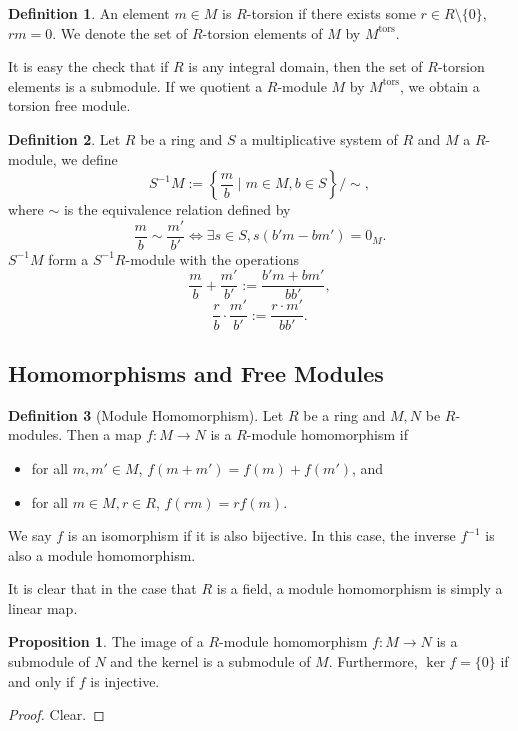 \documentclass[]{article}
\theoremstyle{definition}
\theoremstyle{definition}
\newtheorem{definition}{Definition}[section]
\newtheorem{proposition}{Proposition}[section]
\begin{document}
\begin{definition}
  An element \(m \in M\) is \(R\)-torsion if there exists some 
  \(r \in R \setminus \{0\}\), \(rm = 0\). We denote the set of \(R\)-torsion 
  elements of \(M\) by \(M^{\text{tors}}\).
\end{definition}

It is easy the check that if \(R\) is any integral domain, then the set of 
\(R\)-torsion elements is a submodule. If we quotient a \(R\)-module \(M\) by 
\(M^{\text{tors}}\), we obtain a torsion free module.

\begin{definition}
  Let \(R\) be a ring and \(S\) a multiplicative system of \(R\) and 
  \(M\) a \(R\)-module, we define 
  \[S^{-1}M := \left\{\frac{m}{b} \mid m \in M, b \in S\right\} / \sim,\]
  where \(\sim\) is the equivalence relation defined by 
  \[\frac{m}{b} \sim \frac{m'}{b'} \iff \exists s \in S, s(b'm - bm') = 0_M.\]
  \(S^{-1}M\) form a \(S^{-1}R\)-module with the operations 
  \[\frac{m}{b} + \frac{m'}{b'} := \frac{b'm + bm'}{bb'},\]
  \[\frac{r}{b} \cdot \frac{m'}{b'} := \frac{r \cdot m'}{bb'}.\]
\end{definition}

\subsection{Homomorphisms and Free Modules}

\begin{definition}[Module Homomorphism]
  Let \(R\) be a ring and \(M, N\) be \(R\)-modules. Then a map \(f : M \to N\) 
  is a \(R\)-module homomorphism if 
  \begin{itemize}
    \item for all \(m, m' \in M\), \(f(m + m') = f(m) + f(m')\), and
    \item for all \(m \in M, r \in R\), \(f(rm) = r f(m)\).
  \end{itemize}
  We say \(f\) is an isomorphism if it is also bijective. In this case, 
  the inverse \(f^{-1}\) is also a module homomorphism.
\end{definition}

It is clear that in the case that \(R\) is a field, a module homomorphism 
is simply a linear map.

\begin{proposition}
  The image of a \(R\)-module homomorphism \(f : M \to N\) is a submodule of 
  \(N\) and the kernel is a submodule of \(M\). Furthermore, \(\ker f = \{0\}\) 
  if and only if \(f\) is injective.
\end{proposition}
\begin{proof}
  Clear.
\end{proof}
\end{document}
